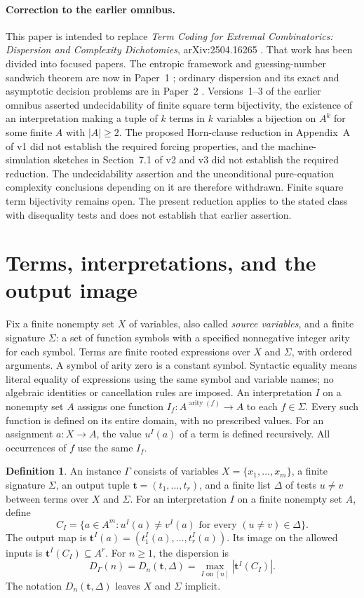 \documentclass[12pt]{article}
\theoremstyle{definition}
\newtheorem{definition}[theorem]{Definition}
\newcommand{\DD}{D}
\begin{document}
\paragraph{Correction to the earlier omnibus.}
This paper is intended to replace \emph{Term Coding for Extremal
Combinatorics: Dispersion and Complexity Dichotomies}, arXiv:2504.16265
\cite{Omnibus}. That work has been divided into focused papers.
The entropic framework and guessing-number sandwich theorem are now in
Paper~1 \cite{Paper1}; ordinary dispersion and its exact and asymptotic
decision problems are in Paper~2 \cite{Paper2}.
Versions~1--3 of the earlier omnibus asserted undecidability of finite
square term bijectivity, the existence of an interpretation making a
tuple of $k$ terms in $k$ variables a bijection on $A^k$ for some finite
$A$ with $|A|\ge2$. The proposed Horn-clause reduction in Appendix~A
of v1 did not establish the required forcing properties, and the
machine-simulation sketches in Section~7.1 of v2 and v3 did not establish
the required reduction. The undecidability assertion and the unconditional
pure-equation complexity conclusions depending on it are therefore
withdrawn. Finite square term bijectivity remains open. The present
reduction applies to the stated class with disequality tests and does
not establish that earlier assertion.

\section{Terms, interpretations, and the output image}\label{sec:language}
Fix a finite nonempty set $X$ of variables, also called \emph{source
variables}, and a finite signature $\Sigma$: a set of function symbols
with a specified nonnegative integer arity for each symbol. Terms are
finite rooted expressions over $X$ and $\Sigma$, with ordered arguments.
A symbol of arity zero is a constant symbol. Syntactic equality means
literal equality of expressions using the same symbol and variable
names; no algebraic identities or cancellation rules are imposed.
An interpretation $I$ on a nonempty set $A$ assigns one function
$I_f:A^{\operatorname{arity}(f)}\to A$ to each $f\in\Sigma$.
Every such function is defined on its entire domain, with no prescribed
values. For an assignment $a:X\to A$, the value $u^I(a)$ of a term is
defined recursively. All occurrences of $f$ use the same $I_f$.

\begin{definition}
An instance $\Gamma$ consists of variables $X=\{x_1,\ldots,x_m\}$,
a finite signature $\Sigma$, an output tuple
$\mathbf t=(t_1,\ldots,t_r)$, and a finite list $\Delta$ of tests
$u\ne v$ between terms over $X$ and $\Sigma$.
For an interpretation $I$ on a finite nonempty set $A$, define
\[
 C_I=\{a\in A^m:u^I(a)\ne v^I(a)
                    \text{ for every }(u\ne v)\in\Delta\}.
\]
The output map is
$\mathbf t^I(a)=(t_1^I(a),\ldots,t_r^I(a))$.
Its image on the allowed inputs is $\mathbf t^I(C_I)\subseteq A^r$.
For $n\ge1$, the dispersion is
\[
 D_\Gamma(n)=\DD_n(\mathbf t,\Delta)
       =\max_{I\text{ on }[n]}|\mathbf t^I(C_I)|.
\]
The notation $\DD_n(\mathbf t,\Delta)$ leaves $X$ and $\Sigma$ implicit.
\end{definition}
\end{document}
